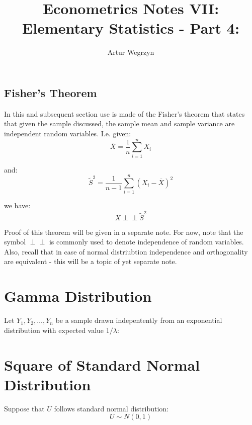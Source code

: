 \documentclass[12pt]{article}
\begin{document}
\title{Econometrics Notes VII: Elementary Statistics - Part 4: }
\author{Artur Wegrzyn}
\maketitle


\tableofcontents


\subsection{Fisher's Theorem}
In this and subsequent section use is made of the Fisher's theorem that states 
that given the sample discussed, the sample mean and sample variance are independent 
random variables. I.e. given:
\begin{equation*}
\overline{X} = \frac{1}{n} \sum_{i=1}^{n} X_i
\end{equation*}

and:
\begin{equation*}
\tilde{S}^2 = \frac{1}{n-1} \sum_{i=1}^{n} (X_i - \overline{X})^2
\end{equation*}

we have:
\begin{equation*}
\overline{X} \perp\!\!\!\perp \tilde{S}^2
\end{equation*}

Proof of this theorem will be given in a separate note. For now, note that the symbol 
$\perp\!\!\!\perp$ is commonly used to denote independence of random variables. Also, 
recall that in case of normal distriubtion independence and orthogonality 
are equivalent - this will be a topic of yet separate note.


\section{Gamma Distribution}
Let $Y_1, Y_2, \dots, Y_n$ be a sample drawn indepentently from an exponential 
distribution with expected value $1 / \lambda$:

\section{Square of Standard Normal Distribution}
Suppose that $U$ follows standard normal distribution:
\begin{equation*}
U \sim N(0, 1)
\end{equation*}
\end{document}
